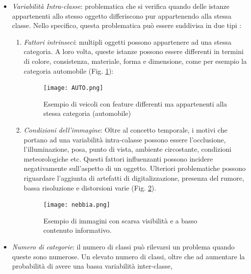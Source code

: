 \begin{itemize}
    \item \emph{Variabilità Intra-classe}: problematica che si verifica quando delle 
    istanze appartenenti allo stesso oggetto differiscono pur appartenendo 
    alla stessa classe. Nello specifico, questa problematica può essere 
    suddivisa in due tipi \cite{liu2020deep}:
    \begin{enumerate}
        \item \emph{Fattori intrinseci}: multipli oggetti possono appartenere ad una 
        stessa categoria. A loro volta, queste istanze possono essere 
        differenti in termini di colore, consistenza, materiale, forma e 
        dimensione, come per esempio la categoria automobile (Fig. \ref{auto}):
        \begin{figure}
            \centering
            \hspace*{1.5cm}
            \texttt{[image: AUTO.png]}
            \centering
            \caption{Esempio di veicoli con feature differenti ma appartenenti alla stessa categoria (automobile)}
            \label{auto}
        \end{figure}
        \item \emph{Condizioni dell'immagine}: Oltre al concetto temporale, i motivi 
        che portano ad una variabilità intra-calasse possono essere l'occlusione, 
        l'illuminazione, posa, punto di vista, ambiente circostante, 
        condizioni meteorologiche etc. Questi fattori influenzanti possono 
        incidere negativamente sull'aspetto di un oggetto. Ulteriori 
        problematiche possono riguardare l'aggiunta di artefatti di digitalizzazione, 
        presenza del rumore, bassa risoluzione e distorsioni varie (Fig. \ref{agenti atmosferici}).
        \begin{figure}
            \centering
            \hspace*{1.7cm}
            \texttt{[image: nebbia.png]}
            \centering
            \caption{Esempio di immagini con scarsa visibilità e a basso contenuto informativo.}
            \label{agenti atmosferici}
        \end{figure}
    \end{enumerate}
    \item \emph{Numero di categorie}: il numero di classi può rilevarsi un problema 
    quando queste sono numerose. Un elevato numero di classi, oltre 
    che ad aumentare la probabilità di avere una bassa variabilità inter-classe, 

\end{itemize}
